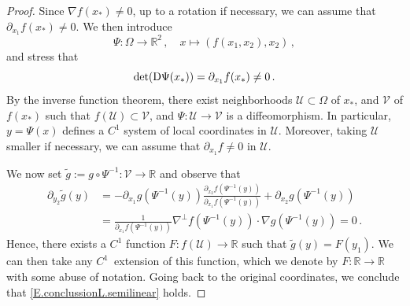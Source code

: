 \documentclass[11pt,oneside]{amsart}
\theoremstyle{definition}
\newcommand{\Om}{\Omega}
\def\RR{\mathbb{R}}
\newcommand{\pd}{\partial}
\numberwithin{equation}{section}
\begin{document}
\begin{proof}
    Since $\nabla f(x_*) \neq 0$, up to a rotation if necessary, we can assume that $\pd_{x_1} f(x_*) \neq 0$. We then introduce $$
    \Psi: \Om \to \RR^2\,, \quad x \mapsto(f(x_1,x_2),x_2)\,,
    $$
    and stress that
    $$
    \det ({\rm D} \Psi(x_*)) = \pd_{x_1} f(x_*) \neq 0\,.
    $$
    By the inverse function theorem, there exist neighborhoods $\mathcal{U} \subset \Omega$ of $x_*$, and $\mathcal{V}$ of $f(x_*)$ such that $f(\mathcal{U}) \subset \mathcal{V}$, and $\Psi: \mathcal{U} \to \mathcal{V}$ is a diffeomorphism. In particular, $y = \Psi(x)$ defines a $C^1$ system of local coordinates in $\mathcal{U}$. Moreover, taking $\mathcal{U}$ smaller if necessary, we can assume that $\pd_{x_1} f \neq 0$ in $\mathcal{U}$.

    We now set $\widetilde{g} := g \circ \Psi^{-1}: \mathcal{V} \to \RR$ and observe that
    \begin{align*}
        \pd_{y_2} \widetilde{g}(y) & = - \pd_{x_1} g (\Psi^{-1}(y)) \frac{\pd_{x_2}f(\Psi^{-1}(y))}{\pd_{x_1}f(\Psi^{-1}(y))} + \pd_{x_2} g(\Psi^{-1}(y)) \\
        & = \frac{1}{\pd_{x_1}f(\Psi^{-1}(y))} \nabla^{\perp}f(\Psi^{-1}(y)) \cdot \nabla g (\Psi^{-1}(y))= 0\,.
    \end{align*}
    Hence, there exists a $C^1$ function $F: f(\mathcal{U}) \to \RR$ such that $\widetilde{g}(y) = F(y_1)$. We can then take any $C^1$~extension of this function, which we denote by $F:\RR\to\RR$ with some abuse of notation. Going back to the original coordinates, we conclude that \eqref{E.conclussionL.semilinear} holds.
\end{proof}
\end{document}
